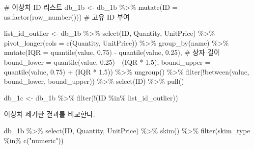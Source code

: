 \documentclass[
  letterpaper,
  DIV=11,
  numbers=noendperiod]{scrreprt}
\newenvironment{Shaded}{\begin{snugshade}}{\end{snugshade}}
\newcommand{\AttributeTok}[1]{\textcolor[rgb]{0.40,0.45,0.13}{#1}}
\newcommand{\CommentTok}[1]{\textcolor[rgb]{0.37,0.37,0.37}{#1}}
\newcommand{\FloatTok}[1]{\textcolor[rgb]{0.68,0.00,0.00}{#1}}
\newcommand{\FunctionTok}[1]{\textcolor[rgb]{0.28,0.35,0.67}{#1}}
\newcommand{\NormalTok}[1]{\textcolor[rgb]{0.00,0.23,0.31}{#1}}
\newcommand{\OtherTok}[1]{\textcolor[rgb]{0.00,0.23,0.31}{#1}}
\newcommand{\SpecialCharTok}[1]{\textcolor[rgb]{0.37,0.37,0.37}{#1}}
\newcommand{\StringTok}[1]{\textcolor[rgb]{0.13,0.47,0.30}{#1}}
\begin{document}
\begin{Shaded}
\begin{Highlighting}[]
\CommentTok{\# 이상치 ID 리스트}
\NormalTok{db\_1b }\OtherTok{\textless{}{-}}\NormalTok{ db\_1b }\SpecialCharTok{\%\textgreater{}\%}
  \FunctionTok{mutate}\NormalTok{(}\AttributeTok{ID =} \FunctionTok{as.factor}\NormalTok{(}\FunctionTok{row\_number}\NormalTok{()))  }\CommentTok{\# 고유 ID 부여}

\NormalTok{list\_id\_outlier }\OtherTok{\textless{}{-}}\NormalTok{ db\_1b }\SpecialCharTok{\%\textgreater{}\%}
  \FunctionTok{select}\NormalTok{(ID, Quantity, UnitPrice) }\SpecialCharTok{\%\textgreater{}\%}
  \FunctionTok{pivot\_longer}\NormalTok{(}\AttributeTok{cols =} \FunctionTok{c}\NormalTok{(Quantity, UnitPrice)) }\SpecialCharTok{\%\textgreater{}\%} 
  \FunctionTok{group\_by}\NormalTok{(name) }\SpecialCharTok{\%\textgreater{}\%}
  \FunctionTok{mutate}\NormalTok{(}\AttributeTok{IQR =} \FunctionTok{quantile}\NormalTok{(value, }\FloatTok{0.75}\NormalTok{) }\SpecialCharTok{{-}} \FunctionTok{quantile}\NormalTok{(value, }\FloatTok{0.25}\NormalTok{), }\CommentTok{\# 상자 길이}
         \AttributeTok{bound\_lower =} \FunctionTok{quantile}\NormalTok{(value, }\FloatTok{0.25}\NormalTok{) }\SpecialCharTok{{-}}\NormalTok{ (IQR }\SpecialCharTok{*} \FloatTok{1.5}\NormalTok{),}
         \AttributeTok{bound\_upper =} \FunctionTok{quantile}\NormalTok{(value, }\FloatTok{0.75}\NormalTok{) }\SpecialCharTok{+}\NormalTok{ (IQR }\SpecialCharTok{*} \FloatTok{1.5}\NormalTok{)) }\SpecialCharTok{\%\textgreater{}\%}
  \FunctionTok{ungroup}\NormalTok{() }\SpecialCharTok{\%\textgreater{}\%}
  \FunctionTok{filter}\NormalTok{(}\SpecialCharTok{!}\FunctionTok{between}\NormalTok{(value, bound\_lower, bound\_upper)) }\SpecialCharTok{\%\textgreater{}\%}
  \FunctionTok{select}\NormalTok{(ID) }\SpecialCharTok{\%\textgreater{}\%} \FunctionTok{pull}\NormalTok{()}
  
\NormalTok{db\_1c }\OtherTok{\textless{}{-}}\NormalTok{ db\_1b }\SpecialCharTok{\%\textgreater{}\%}
  \FunctionTok{filter}\NormalTok{(}\SpecialCharTok{!}\NormalTok{(ID }\SpecialCharTok{\%in\%}\NormalTok{ list\_id\_outlier)) }
\end{Highlighting}
\end{Shaded}

이상치 제거한 결과를 비교한다.

\begin{Shaded}
\begin{Highlighting}[]
\NormalTok{db\_1b }\SpecialCharTok{\%\textgreater{}\%} \FunctionTok{select}\NormalTok{(ID, Quantity, UnitPrice) }\SpecialCharTok{\%\textgreater{}\%} \FunctionTok{skim}\NormalTok{() }\SpecialCharTok{\%\textgreater{}\%}
  \FunctionTok{filter}\NormalTok{(skim\_type }\SpecialCharTok{\%in\%} \FunctionTok{c}\NormalTok{(}\StringTok{"numeric"}\NormalTok{)) }
\end{Highlighting}
\end{Shaded}
\end{document}
